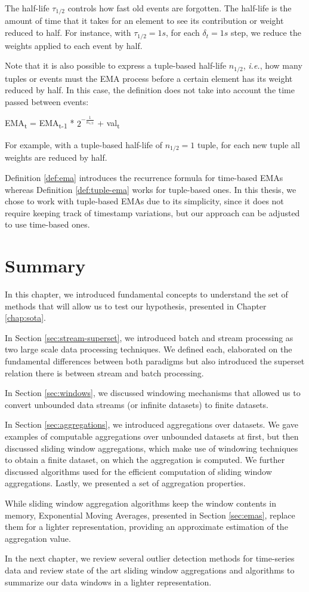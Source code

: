 The half-life $\tau_{1/2}$ controls how fast old events are forgotten. The half-life is the amount of time that it takes for an element to see its contribution or weight reduced to half. For instance, with $\tau_{1/2} = 1s$, for each $\delta_t = 1s$ step, we reduce the weights applied to each event by half. 

Note that it is also possible to express a tuple-based half-life $n_{1/2}$, \textit{i.e.}, how many tuples or events must the EMA process before a certain element has its weight reduced by half. In this case, the definition does not take into account the time passed between events:
\begin{definition}
EMA\textsubscript{t} = EMA\textsubscript{t-1} * $2^{-\frac{1}{n_{1/2}}}$ + val\textsubscript{t}
\label{def:tuple-ema}
\end{definition}
For example, with a tuple-based half-life of $n_{1/2}=1$ tuple, for each new tuple all weights are reduced by half.

Definition \ref{def:ema} introduces the recurrence formula for time-based EMAs whereas Definition \ref{def:tuple-ema} works for tuple-based ones. In this thesis, we chose to work with tuple-based EMAs due to its simplicity, since it does not require keeping track of timestamp variations, but our approach can be adjusted to use time-based ones.

\section{Summary}
In this chapter, we introduced fundamental concepts to understand the set of methods that will allow us to test our hypothesis, presented in Chapter \ref{chap:sota}.

In Section \ref{sec:stream-superset}, we introduced batch and stream processing as two large scale data processing techniques. We defined each, elaborated on the fundamental differences between both paradigms but also introduced the superset relation there is between stream and batch processing.

In Section \ref{sec:windows}, we discussed windowing mechanisms that allowed us to convert unbounded data streams (or infinite datasets) to finite datasets.

In Section \ref{sec:aggregations}, we introduced aggregations over datasets. We gave examples of computable aggregations over unbounded datasets at first, but then discussed sliding window aggregations, which make use of windowing techniques to obtain a finite dataset, on which the aggregation is computed. We further discussed algorithms used for the efficient computation of sliding window aggregations. Lastly, we presented a set of aggregation properties. 

While sliding window aggregation algorithms keep the window contents in memory, Exponential Moving Averages, presented in Section \ref{sec:emas}, replace them for a lighter representation, providing an approximate estimation of the aggregation value.

In the next chapter, we review several outlier detection methods for time-series data and review state of the art sliding window aggregations and algorithms to summarize our data windows in a lighter representation.